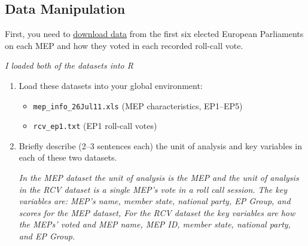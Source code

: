 \documentclass[12pt,letterpaper]{article}
\begin{document}
\subsection*{Data Manipulation}
First, you need to \href{https://personal.lse.ac.uk/hix/HixNouryRolandEPdata.HTM}{download data} from the first six elected European Parliaments on each MEP and how they voted in each recorded roll-call vote.
\vspace{.25cm}
	 
	\textit {I loaded both of the datasets into R}
\begin{enumerate}
\item Load these datasets into your global environment:
\begin{itemize}
	\item \texttt{mep\_info\_26Jul11.xls} (MEP characteristics, EP1–EP5)
	\item \texttt{rcv\_ep1.txt} (EP1 roll-call votes)
\end{itemize}

\item Briefly describe (2–3 sentences each) the unit of analysis and key variables in each of these two datasets.


\textit  {In the MEP dataset the unit of analysis is the MEP and the unit of analysis in the RCV dataset is a single MEP's vote in a roll call session. The key variables are: MEP's name, member state, national party, EP Group, and scores for the MEP dataset, For the RCV dataset the key variables are how the MEPs' voted and MEP name, MEP ID, member state, national party, and EP Group.}  


\end{enumerate}
\end{document}

